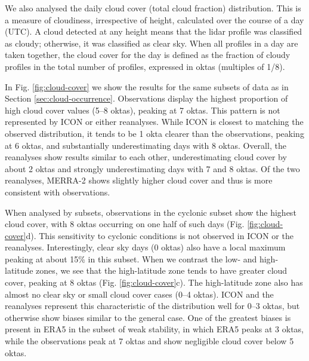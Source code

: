 \documentclass[12pt,a4paper]{article}
\begin{document}
We also analysed the daily cloud cover (total cloud fraction) distribution.
This is a measure of cloudiness, irrespective of height, calculated over the
course of a day (UTC). A cloud detected at any height means that the lidar
profile was classified as cloudy; otherwise, it was classified as clear sky.
When all profiles in a day are taken together, the cloud cover for the day is
defined as the fraction of cloudy profiles in the total number of profiles,
expressed in oktas (multiples of 1/8).

In Fig.  \ref{fig:cloud-cover} we show the results for the same subsets of data
as in Section \ref{sec:cloud-occurrence}. Observations display the highest
proportion of high cloud cover values (5--8 oktas), peaking at 7 oktas. This
pattern is not represented by ICON or either reanalyses.  While ICON is closest
to matching the observed distribution, it tends to be 1 okta clearer than the
observations, peaking at 6 oktas, and substantially underestimating days with 8
oktas.  Overall, the reanalyses show results similar to each other,
underestimating cloud cover by about 2 oktas and strongly underestimating days
with 7 and 8 oktas. Of the two reanalyses, MERRA-2 shows slightly higher cloud
cover and thus is more consistent with observations.

When analysed by subsets, observations in the cyclonic subset show the highest
cloud cover, with 8 oktas occurring on one half of such days (Fig.
\ref{fig:cloud-cover}d).  This sensitivity to cyclonic conditions is not
observed in ICON or the reanalyses. Interestingly, clear sky days (0 oktas)
also have a local maximum peaking at about 15\% in this subset.  When we
contrast the low- and high-latitude zones, we see that the high-latitude zone
tends to have greater cloud cover, peaking at 8 oktas (Fig.
\ref{fig:cloud-cover}c). The high-latitude zone also has almost no clear sky or
small cloud cover cases (0--4 oktas). ICON and the reanalyses represent this
characteristic of the distribution well for 0--3 oktas, but otherwise show
biases similar to the general case. One of the greatest biases is present in
ERA5 in the subset of weak stability, in which ERA5 peaks at 3 oktas, while the
observations peak at 7 oktas and show negligible cloud cover below 5 oktas.
\end{document}
